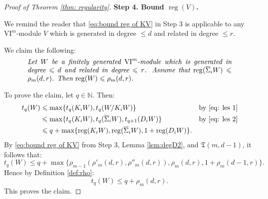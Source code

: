 \documentclass{amsart}
\numberwithin{equation}{section}
\DeclareMathOperator{\reg}{reg}
\newcommand{\N}{{\mathbb{N}}}
\newcommand{\VI}{{\mathrm{VI}}}
\newcommand{\SSigma}{{\overline{\Sigma}}}
\begin{document}
\begin{proof}[Proof of Theorem \ref{thm: regularity}]
   \bigskip 

   {\bf Step 4. Bound $\reg(V)$.}

   \medskip 

   We remind the reader that \eqref{eq:bound reg of KV} in Step 3 is applicable to any $\VI^m$-module $V$ which is generated in degree $\leqslant d$ and related in degree $\leqslant r$.

   We claim the following:
   \begin{equation*}
      \parbox{.85\textwidth}{\it Let $W$ be a finitely generated $\VI^m$-module which is generated in degree $\leqslant d$ and related in degree $\leqslant r$.  
      Assume that $\reg(\SSigma_i W) \leqslant \rho_m(d,r)$. Then $\reg(W) \leqslant \rho_m(d,r)$.}
   \end{equation*}

   To prove the claim, let $q\in \N$. Then: 
   \begin{align*}
     t_q(W) &\leqslant \max\{ t_q(K_i W), t_q(W/K_i W) \}  & \mbox{by \eqref{eq: les 1}}\\
     &\leqslant \max\{ t_q(K_i W), t_q(\SSigma_i W), t_{q+1}(D_i W) \} & \mbox{by \eqref{eq: les 2}}\\
     &\leqslant  q + \max\{ \reg(K_i W), \reg(\SSigma_i W), 1+\reg(D_i W) \}. &
   \end{align*}
   By \eqref{eq:bound reg of KV} from Step 3, Lemma \ref{lem:degD2}, and $\mathfrak{T}(m,d-1)$, it follows that: 
   \[ t_q(W) \leqslant  q + \max\{ \rho_{m-1}(\rho'_m(d,r), \rho''_m(d,r)), \rho_m(d,r), 1+\rho_m(d-1, r) \}. \]
   Hence by Definition \ref{def:rho}:
   \[ t_q(W) \leqslant q + \rho_m(d,r). \]
   This proves the claim.


\end{proof}
\end{document}
